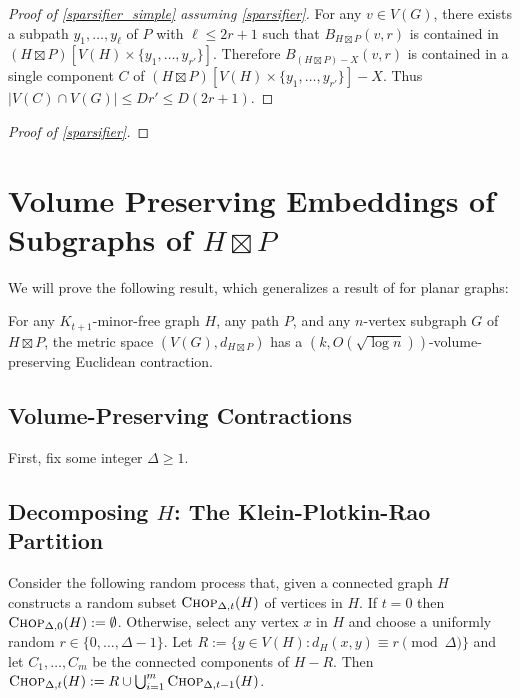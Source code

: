 \documentclass{patmorin}
\begin{document}
\begin{proof}[Proof of \cref{sparsifier_simple} assuming \cref{sparsifier}]
  For any $v\in V(G)$, there exists a subpath $y_1,\ldots,y_{\ell}$ of $P$ with $\ell\le 2r+1$ such that $B_{H\boxtimes P}(v,r)$ is contained in $(H\boxtimes P)[V(H)\times \{y_1,\ldots,y_{r'}\}]$.  Therefore $B_{(H\boxtimes P)-X}(v,r)$ is contained in a single component $C$ of $(H\boxtimes P)[V(H)\times \{y_1,\ldots,y_{r'}\}]-X$.  Thus $|V(C)\cap V(G)|\le Dr'\le D(2r+1)$.
\end{proof}

\begin{proof}[Proof of \cref{sparsifier}]
\end{proof}


\section{\boldmath Volume Preserving Embeddings of Subgraphs of $H\boxtimes P$}



We will prove the following result, which generalizes a result of \citet{rao:small} for planar graphs:

\begin{thm}
  For any $K_{t+1}$-minor-free graph $H$, any path $P$, and any $n$-vertex subgraph $G$ of $H\boxtimes P$, the metric space $(V(G),d_{H\boxtimes P})$ has a $(k,O(\sqrt{\log n}))$-volume-preserving Euclidean contraction.
\end{thm}



\subsection{Volume-Preserving Contractions}

First, fix some integer $\Delta \ge 1$.

\subsection{Decomposing $H$: The Klein-Plotkin-Rao Partition}

Consider the following random process that, given a connected graph $H$ constructs a random subset $\textsc{Chop}_{\Delta,t}(H)$ of vertices in $H$. If $t=0$ then $\textsc{Chop}_{\Delta,0}(H):=\emptyset$.  Otherwise, select any vertex $x$ in $H$ and choose a uniformly random $r\in\{0,\ldots,\Delta-1\}$.  Let $R:=\{y\in V(H):d_{H}(x,y)\equiv r\pmod{\Delta}\}$ and let $C_1,\ldots,C_m$ be the connected components of $H-R$.  Then $\textsc{Chop}_{\Delta,t}(H):=R\cup\bigcup_{i=1}^m \textsc{Chop}_{\Delta,t-1}(H)$.
\end{document}
